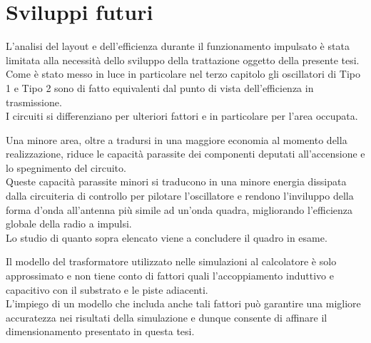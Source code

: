 \documentclass[a4paper, 12pt]{memoir}
\begin{document}
\section{Sviluppi futuri}
L'analisi del layout e dell'efficienza durante il funzionamento impulsato è
stata limitata alla necessità dello sviluppo della trattazione oggetto della
presente tesi.\\
Come è stato messo in luce in particolare nel terzo capitolo gli oscillatori di
Tipo 1 e Tipo 2 sono di fatto equivalenti dal punto di vista dell'efficienza in
trasmissione.\\
I circuiti si differenziano per ulteriori fattori e in particolare per l'area
occupata.

Una minore area, oltre a tradursi in una maggiore economia al momento della
realizzazione, riduce le capacità parassite dei componenti deputati
all'accensione e lo spegnimento del circuito.\\
Queste capacità parassite minori si traducono in una minore energia dissipata
dalla circuiteria di controllo per pilotare l'oscillatore e rendono l'inviluppo
della forma d'onda all'antenna più simile ad un'onda quadra, migliorando
l'efficienza globale della radio a impulsi.\\
Lo studio di quanto sopra elencato viene a concludere il quadro in esame.

Il modello del trasformatore utilizzato nelle simulazioni al calcolatore è solo
approssimato e non tiene conto di fattori quali l'accoppiamento induttivo e
capacitivo con il substrato e le piste adiacenti.\\
L'impiego di un modello che includa anche tali fattori può garantire una
migliore accuratezza nei risultati della simulazione e dunque consente di
affinare il dimensionamento presentato in questa tesi.



\end{document}
